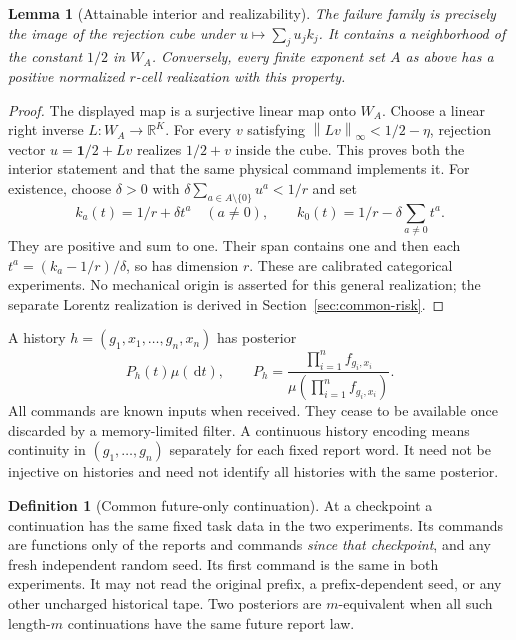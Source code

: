 \documentclass[11pt]{amsart}
\newtheorem{lemma}[theorem]{Lemma}
\theoremstyle{definition}\newtheorem{definition}[theorem]{Definition}
\theoremstyle{remark}\newtheorem{remark}[theorem]{Remark}
\newcommand{\R}{\mathbb R}\newcommand{\N}{\mathbb N}\newcommand{\C}{\mathbb C}
\newcommand{\one}{\mathbf 1}\newcommand{\dd}{\,\mathrm d}
\newcommand{\norm}[1]{\left\lVert#1\right\rVert}
\begin{document}
\begin{lemma}[Attainable interior and realizability]\label{lem:interior}
The failure family is precisely the image of the rejection cube under
$u\mapsto\sum_ju_jk_j$. It contains a neighborhood of the constant $1/2$
in $W_A$. Conversely, every finite exponent set $A$ as above has a positive
normalized $r$-cell realization with this property.
\end{lemma}
\begin{proof}
The displayed map is a surjective linear map onto $W_A$. Choose a linear
right inverse $L:W_A\to\R^K$. For every $v$ satisfying
$\norm{Lv}_\infty<1/2-\eta$, rejection vector
$u=\one/2+Lv$ realizes $1/2+v$ inside the cube. This proves both the
interior statement and that the same physical command implements it.
For existence, choose $\delta>0$ with
$\delta\sum_{a\in A\setminus\{0\}}u^a<1/r$ and set
\[
 k_a(t)=1/r+\delta t^a\quad(a\ne0),\qquad
 k_0(t)=1/r-\delta\sum_{a\ne0}t^a.
\]
They are positive and sum to one. Their span contains one and then each
$t^a=(k_a-1/r)/\delta$, so has dimension $r$. These are calibrated
categorical experiments. No mechanical origin is asserted for this general
realization; the separate Lorentz realization is derived in
Section~\ref{sec:common-risk}.
\end{proof}

A history $h=(g_1,x_1,\ldots,g_n,x_n)$ has posterior
\begin{equation}\label{eq:posterior}
 P_h(t)\mu(\dd t),\qquad
 P_h=\frac{\prod_{i=1}^nf_{g_i,x_i}}{\mu(\prod_{i=1}^nf_{g_i,x_i})}.
\end{equation}
All commands are known inputs when received. They cease to be available
once discarded by a memory-limited filter. A continuous history encoding
means continuity in $(g_1,\ldots,g_n)$ separately for each fixed report
word. It need not be injective on histories and need not identify all
histories with the same posterior.

\begin{definition}[Common future-only continuation]\label{def:future}
At a checkpoint a continuation has the same fixed task data in the two
experiments. Its commands are functions only of the reports and commands
\emph{since that checkpoint}, and any fresh independent random seed. Its
first command is the same in both experiments. It may not read the
original prefix, a prefix-dependent seed, or any other uncharged historical
tape. Two posteriors are $m$-equivalent when all such length-$m$
continuations have the same future report law.
\end{definition}
\end{document}
